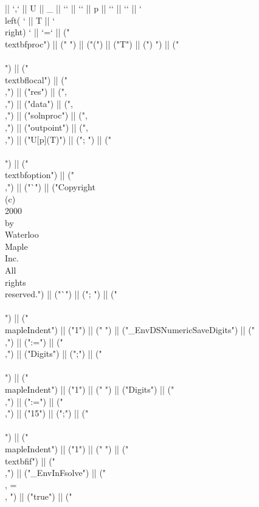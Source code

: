 \documentclass{article}
\begin{document}
\begin{center}
\begin{maplelatex}
{ || `,` || U || _ || `{` || `{` || p || `}` || `}` || ` \\left( ` || T || ` \\right) ` || `=` || ("\\textbf{proc}") || (" ") || ("(") || ("T") || (") ") || ("\\\\\n") || ("\\textbf{local}") || (" \\,") || ("res") || (",\\,") || ("data") || (",\\,") || ("solnproc") || (",\\,") || ("outpoint") || (",\\,") || ("U[p](T)") || ("; ") || ("\\\\\n") || ("\\textbf{option}") || (" \\,") || ("`") || ("Copyright\\ (c)\\ 2000\\ by\\ Waterloo\\ Maple\\ Inc.\\ All\\ rights\\ reserved.") || ("`") || ("; ") || ("\\\\\n") || ("\\mapleIndent{") || ("1") || ("} ") || ("_EnvDSNumericSaveDigits") || ("\\,") || (":=") || ("\\,") || ("Digits") || (";") || ("\\\\\n") || ("\\mapleIndent{") || ("1") || ("} ") || ("Digits") || ("\\,") || (":=") || ("\\,") || ("15") || (";") || ("\\\\\n") || ("\\mapleIndent{") || ("1") || ("} ") || ("\\textbf{if}") || (" \\,") || ("_EnvInFsolve") || (" \\, = \\, ") || ("true") || (" }
\end{maplelatex}
\end{center}
\end{document}

